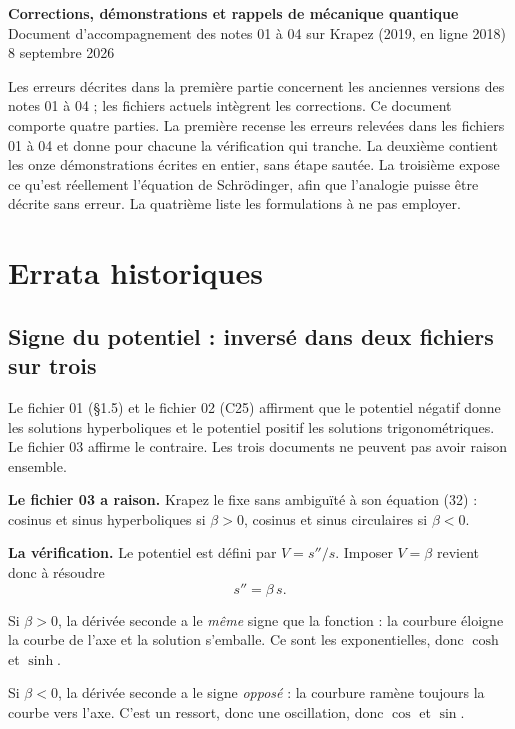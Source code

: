 \documentclass[11pt,a4paper]{article}
\begin{document}
\begin{center}
{\Large\bfseries Corrections, démonstrations et rappels de mécanique quantique}\\[4pt]
{\normalsize Document d'accompagnement des notes 01 à 04 sur Krapez (2019, en ligne 2018)}\\[2pt]
{\small 8 septembre 2026}
\end{center}

\vspace{6pt}

Les erreurs décrites dans la première partie concernent les anciennes versions
des notes 01 à 04 ; les fichiers actuels intègrent les corrections.
Ce document comporte quatre parties. La première recense les erreurs relevées dans les fichiers 01 à 04
et donne pour chacune la vérification qui tranche. La deuxième contient les onze démonstrations écrites
en entier, sans étape sautée. La troisième expose ce qu'est réellement l'équation de Schrödinger, afin
que l'analogie puisse être décrite sans erreur. La quatrième liste les formulations à ne pas employer.

\section{Errata historiques}

\subsection{Signe du potentiel : inversé dans deux fichiers sur trois}

Le fichier 01 (§1.5) et le fichier 02 (C25) affirment que le potentiel négatif donne les solutions
hyperboliques et le potentiel positif les solutions trigonométriques. Le fichier 03 affirme le
contraire. Les trois documents ne peuvent pas avoir raison ensemble.

\textbf{Le fichier 03 a raison.} Krapez le fixe sans ambiguïté à son équation (32) : cosinus et sinus
hyperboliques si $\beta > 0$, cosinus et sinus circulaires si $\beta < 0$.

\textbf{La vérification.} Le potentiel est défini par $V = s''/s$. Imposer $V = \beta$ revient donc à
résoudre
\[ s'' = \beta\, s . \]

Si $\beta > 0$, la dérivée seconde a le \emph{même} signe que la fonction : la courbure éloigne la
courbe de l'axe et la solution s'emballe. Ce sont les exponentielles, donc $\cosh$ et $\sinh$.

Si $\beta < 0$, la dérivée seconde a le signe \emph{opposé} : la courbure ramène toujours la courbe
vers l'axe. C'est un ressort, donc une oscillation, donc $\cos$ et $\sin$.
\end{document}
